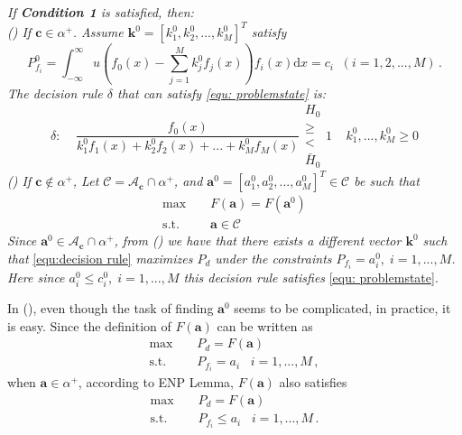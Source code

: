 \documentclass[12pt,journal,a4paper,twoside,onecolumn,draft]{IEEEtran}
\newcommand{\rmnum}[1]{\romannumeral #1}
\begin{document}
\begin{spacing}{2.5}
\noindent \textit{
If \textnormal{\textbf{Condition 1}} is satisfied, then:
\\\textnormal{(\rmnum{1})} If $\mathbf{c} \in \alpha^+$. Assume $\mathbf{k}^0 = [k_1^0, k_2^0, ..., k_M^0]^T$ satisfy
}
\begin{equation}
\label{equ:Pf}
  P_{f_i}^0 = \int_{-\infty}^{\infty} u(f_0(x) - \sum_{j=1}^{M}k_j^0f_j(x))f_i(x)\mathrm{d}x = c_i \;\; (i= 1, 2, ..., M)\,.
\end{equation}
\textit{
The decision rule $\delta $ that can satisfy  \eqref{equ: problemstate} is:
}
\begin{equation}
\label{equ:decision rule}
\delta:\;\;\;\;\frac{f_0(x)}{k_1^0f_1(x) + k_2^0f_2(x) + ... + k_M^0f_M(x) } \substack{H_0 \\ \geq \\ < \\ \bar{H}_0} 1\;\;\;\;k_1^0, ..., k_M^0 \geq 0
\end{equation}
\textit{
\noindent \textnormal{(\rmnum{2})} If $\mathbf{c} \notin \alpha^+$, Let $\mathcal{C} = \mathcal{A}_{\mathbf{c}} \cap \alpha^+$, and $\mathbf{a}^0 = [a_1^0, a_2^0, ..., a_M^0]^T \in \mathcal{C}$ be such that
}
\begin{equation}
\begin{split}
\label{equ: F0}
\max\;\;\;\;&F(\mathbf{a}) = F(\mathbf{a}^0)\\
\text{s.t.}\;\;\;\;&\mathbf{a} \in \mathcal{C}
\end{split}
\end{equation}
\textit{
Since $\mathbf{a}^0 \in \mathcal{A}_{\mathbf{c}} \cap \alpha^+$, from \textnormal{(\rmnum{1})} we have that there exists a different vector $\mathbf{k}^0$ such that}  \eqref{equ:decision rule} \textit{ maximizes $P_d$ under the constraints $P_{f_i} = a_i^0, \;i=1, ..., M$. Here since $a_i^0 \leq c_i^0, \;i=1, ..., M$ this decision rule  satisfies} \eqref{equ: problemstate}.

In  (\rmnum{2}), even though the task of finding $\mathbf{a}^0$ seems to be complicated, in practice, it is easy. Since the definition of $F(\mathbf{a})$ can be written as
\begin{equation}
  \begin{split}
    \max\;\;\;\;&P_d = F(\mathbf{a})\\
    \text{s.t.}\;\;\;\;&P_{f_i} = a_i\;\;\;i=1, ..., M\,,
  \end{split}
\end{equation}
when $\mathbf{a} \in \alpha^+$, according to ENP Lemma, $F(\mathbf{a})$ also satisfies
\begin{equation}
  \begin{split}
  \label{equ: F}
        \max\;\;\;\;&P_d = F(\mathbf{a})\\
    \text{s.t.}\;\;\;\;&P_{f_i} \leq a_i\;\;\;i=1, ..., M\,.
  \end{split}
\end{equation}


\end{spacing}
\end{document}
